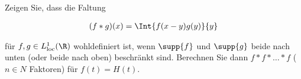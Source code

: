 
\begin{exercise}

Zeigen Sie, dass die Faltung

\begin{align*}
    (f \ast g)(x)
    =
    \Int{f(x - y) g(y)}{y}
\end{align*}

für $f, g \in L^1_{\text{loc}}(\R)$ wohldefiniert ist, wenn $\supp{f}$ und $\supp{g}$ beide nach unten (oder beide nach oben) beschränkt sind.
Berechnen Sie dann $f \ast f \ast \ldots \ast f$ ($n \in N$ Faktoren) für $f(t) = H(t)$.

\end{exercise}


